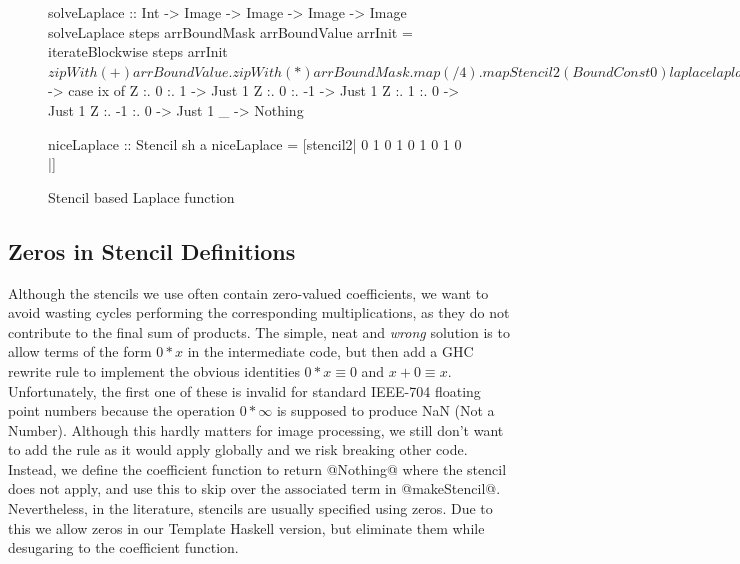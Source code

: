 \begin{figure}
\begin{small}
\begin{code}
solveLaplace :: Int -> Image -> Image -> Image -> Image
solveLaplace steps arrBoundMask arrBoundValue arrInit
 = iterateBlockwise steps arrInit
 $ zipWith (+) arrBoundValue 
 . zipWith (*) arrBoundMask
 . map (/ 4) . mapStencil2 (BoundConst 0) laplace

laplace :: Stencil sh a
laplace     =  makeStencil (Z :. 3 :. 3)
            $ \ix -> case ix of
                      Z :.  0 :.  1 -> Just 1
                      Z :.  0 :. -1 -> Just 1
                      Z :.  1 :.  0 -> Just 1
                      Z :. -1 :.  0 -> Just 1
                      _             -> Nothing

niceLaplace :: Stencil sh a
niceLaplace =  [stencil2| 0 1 0
                          1 0 1 
                          0 1 0 |]
\end{code}
\end{small}	
\caption{Stencil based Laplace function}
\label{fig:NewSolveLaplace}
\end{figure}


\subsection{Zeros in Stencil Definitions}
Although the stencils we use often contain zero-valued coefficients, we want to avoid wasting cycles performing the corresponding multiplications, as they do not contribute to the final sum of products. The simple, neat and \emph{wrong} solution is to allow terms of the form $0*x$ in the intermediate code, but then add a GHC rewrite rule \cite{PeytonJones:playing-by-the-rules} to implement the obvious identities $0*x \equiv 0$ and $x+0 \equiv x$. Unfortunately, the first one of these is invalid for standard \mbox{IEEE-704} floating point numbers because the operation $0*\infty$ is supposed to produce NaN (Not a Number). Although this hardly matters for image processing, we still don't want to add the rule as it would apply globally and we risk breaking other code. Instead, we define the coefficient function to return @Nothing@ where the stencil does not apply, and use this to skip over the associated term in @makeStencil@. Nevertheless, in the literature, stencils are usually specified using zeros. Due to this we allow zeros in our Template Haskell version, but eliminate them while desugaring to the coefficient function. 

